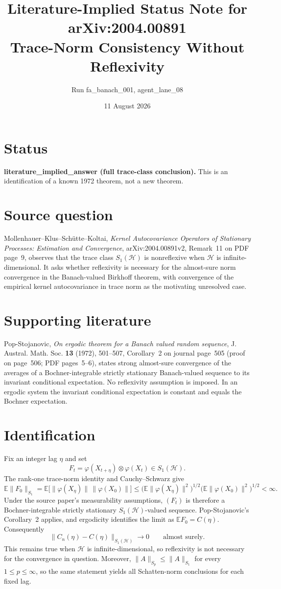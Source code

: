 \documentclass[11pt]{article}
\title{Literature-Implied Status Note for arXiv:2004.00891\\
Trace-Norm Consistency Without Reflexivity}
\author{Run fa\_banach\_001, agent\_lane\_08}
\date{11 August 2026}
\newcommand{\Hh}{\mathcal H}
\newcommand{\E}{\mathbb E}
\begin{document}
\maketitle

\section*{Status}

\textbf{literature\_implied\_answer (full trace-class conclusion).}
This is an identification of a known 1972 theorem, not a new theorem.

\section*{Source question}

Mollenhauer--Klus--Sch\"utte--Koltai,
\emph{Kernel Autocovariance Operators of Stationary Processes: Estimation
and Convergence}, arXiv:2004.00891v2, Remark~11 on PDF page~9, observes that
the trace class $S_1(\Hh)$ is nonreflexive when $\Hh$ is infinite-dimensional.
It asks whether reflexivity is necessary for the almost-sure norm convergence
in the Banach-valued Birkhoff theorem, with convergence of the empirical
kernel autocovariance in trace norm as the motivating unresolved case.

\section*{Supporting literature}

Pop-Stojanovic, \emph{On ergodic theorem for a Banach valued random
sequence}, J. Austral. Math. Soc. \textbf{13} (1972), 501--507,
Corollary~2 on journal page~505 (proof on page~506; PDF pages~5--6), states
strong almost-sure convergence of the averages of a Bochner-integrable
strictly stationary Banach-valued sequence to its invariant conditional
expectation.  No reflexivity assumption is imposed.  In an ergodic system the
invariant conditional expectation is constant and equals the Bochner
expectation.

\section*{Identification}

Fix an integer lag $\eta$ and set
\[
 F_t=\varphi(X_{t+\eta})\otimes\varphi(X_t)\in S_1(\Hh).
\]
The rank-one trace-norm identity and Cauchy--Schwarz give
\[
 \E\|F_0\|_{S_1}
 =\E\bigl[\|\varphi(X_\eta)\|\,\|\varphi(X_0)\|\bigr]
 \leq
 \bigl(\E\|\varphi(X_\eta)\|^2\bigr)^{1/2}
 \bigl(\E\|\varphi(X_0)\|^2\bigr)^{1/2}<\infty.
\]
Under the source paper's measurability assumptions, $(F_t)$ is therefore a
Bochner-integrable strictly stationary $S_1(\Hh)$-valued sequence.
Pop-Stojanovic's Corollary~2 applies, and ergodicity identifies the limit as
$\E F_0=C(\eta)$. Consequently
\[
 \|C_n(\eta)-C(\eta)\|_{S_1(\Hh)}\longrightarrow 0
 \qquad\text{almost surely}.
\]
This remains true when $\Hh$ is infinite-dimensional, so reflexivity is not
necessary for the convergence in question.  Moreover,
$\|A\|_{S_p}\leq\|A\|_{S_1}$ for every $1\leq p\leq\infty$, so the same
statement yields all Schatten-norm conclusions for each fixed lag.
\end{document}
